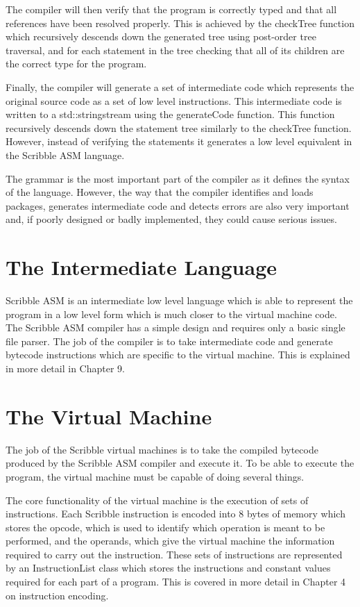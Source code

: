 \documentclass[]{final_report}
\begin{document}
The compiler will then verify that the program is correctly typed and that all references have been resolved properly. This is achieved by the checkTree function which recursively descends down the generated tree using post-order tree traversal, and for each statement in the tree checking that all of its children are the correct type for the program.

Finally, the compiler will generate a set of intermediate code which represents the original source code as a set of low level instructions. This intermediate code is written to a std::stringstream using the generateCode function. This function recursively descends down the statement tree similarly to the checkTree function. However, instead of verifying the statements it generates a low level equivalent in the Scribble ASM language.

The grammar is the most important part of the compiler as it defines the syntax of the language. However, the way that the compiler identifies and loads packages, generates intermediate code and detects errors are also very important and, if poorly designed or badly implemented, they could cause serious issues.

\section{The Intermediate Language}

Scribble ASM is an intermediate low level language which is able to represent the program in a low level form which is much closer to the virtual machine code. The Scribble ASM compiler has a simple design and requires only a basic single file parser. The job of the compiler is to take intermediate code and generate bytecode instructions which are specific to the virtual machine. This is explained in more detail in Chapter 9.

\section{The Virtual Machine}

The job of the Scribble virtual machines is to take the compiled bytecode produced by the Scribble ASM compiler and execute it. To be able to execute the program, the virtual machine must be capable of doing several things.

The core functionality of the virtual machine is the execution of sets of instructions. Each Scribble instruction is encoded into 8 bytes of memory which stores the opcode, which is used to identify which operation is meant to be performed, and the operands, which give the virtual machine the information required to carry out the instruction. These sets of instructions are represented by an InstructionList class which stores the instructions and constant values required for each part of a program. This is covered in more detail in Chapter 4 on instruction encoding.
\end{document}
